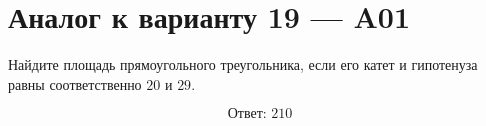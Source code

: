 


\section*{Аналог к варианту 19 — A01}
Найдите площадь прямоугольного треугольника, если его катет и гипотенуза равны соответственно \(20\) и \(29\).
\begin{center}\figRightTriangle\end{center}
\[\boxed{\text{Ответ: }210}\]

